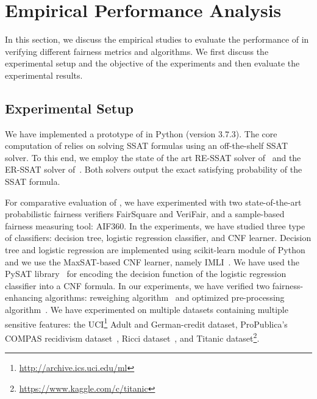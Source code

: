 \section{Empirical Performance Analysis}
\label{fairness_justicia_sec:experiments}
In this section, we discuss the empirical studies to evaluate the performance of {\justicia} in verifying different fairness metrics and algorithms. We first discuss the experimental setup and the objective of the experiments and then evaluate the experimental results.
\subsection{Experimental Setup}
We have implemented a prototype of {\justicia} in Python (version $ 3.7.3 $). The core computation of {\justicia} relies on solving SSAT formulas using an off-the-shelf SSAT solver. To this end, we employ the state of the art RE-SSAT solver of~\cite{lee2017solving} and the ER-SSAT solver of~\cite{lee2018solving}. Both solvers output the exact  satisfying probability of the SSAT formula. 

For comparative evaluation of {\justicia}, we have experimented with two state-of-the-art probabilistic fairness verifiers FairSquare and VeriFair, and a sample-based fairness measuring tool: AIF360. In the experiments, we have studied three type of classifiers: decision tree, logistic regression classifier, and CNF learner. Decision tree and logistic regression are implemented using scikit-learn module of Python~\cite{scikit-learn} and we use the MaxSAT-based CNF learner, namely IMLI~\cite{GM2019}. We have used the PySAT library~\cite{imms-sat18} for encoding the decision function of the logistic regression classifier into a CNF formula. In our experiments, we have verified two fairness-enhancing algorithms: reweighing algorithm~\cite{kamiran2012data} and optimized pre-processing  algorithm~\cite{calmon2017optimized}. 
We have experimented on multiple datasets containing multiple sensitive features: the UCI\footnote{\url{ http://archive.ics.uci.edu/ml}} Adult and German-credit dataset,  ProPublica’s COMPAS recidivism dataset~\cite{angwin2016machine}, Ricci dataset~\cite{mcginley2010ricci}, and Titanic dataset\footnote{\url{https://www.kaggle.com/c/titanic}}.

